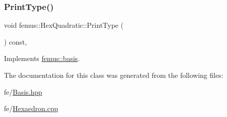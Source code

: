 \mbox{\label{classfemus_1_1_hex_quadratic_a23f9ff89bfb12290b04237c5152334fd}} 
\subsubsection{\texorpdfstring{Print\+Type()}{PrintType()}}
{\footnotesize\ttfamily void femus\+::\+Hex\+Quadratic\+::\+Print\+Type (\begin{DoxyParamCaption}{ }\end{DoxyParamCaption}) const\hspace{0.3cm}{\ttfamily [inline]}, {\ttfamily [virtual]}}



Implements \mbox{\hyperlink{classfemus_1_1basis_abbae7bf8f31ec5793c911bc6d4ea0572}{femus\+::basis}}.



The documentation for this class was generated from the following files\+:\begin{DoxyCompactItemize}
\item 
fe/\mbox{\hyperlink{_basis_8hpp}{Basis.\+hpp}}\item 
fe/\mbox{\hyperlink{_hexaedron_8cpp}{Hexaedron.\+cpp}}\end{DoxyCompactItemize}
